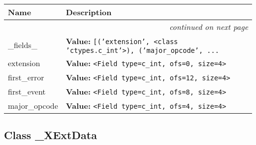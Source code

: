     \vspace{-1cm}
\hspace{\varindent}\begin{longtable}{|p{\varnamewidth}|p{\vardescrwidth}|l}
\cline{1-2}
\cline{1-2} \centering \textbf{Name} & \centering \textbf{Description}& \\
\cline{1-2}
\endhead\cline{1-2}\multicolumn{3}{r}{\small\textit{continued on next page}}\\\endfoot\cline{1-2}
\endlastfoot\raggedright \_\-f\-i\-e\-l\-d\-s\-\_\- & \raggedright \textbf{Value:} 
{\tt \texttt{[}\texttt{(}\texttt{'}\texttt{extension}\texttt{'}\texttt{, }{\textless}class 'ctypes.c\_int'{\textgreater}\texttt{)}\texttt{, }\texttt{(}\texttt{'}\texttt{major\_opcode}\texttt{'}\texttt{, }\texttt{...}}&\\
\cline{1-2}
\raggedright e\-x\-t\-e\-n\-s\-i\-o\-n\- & \raggedright \textbf{Value:} 
{\tt {\textless}Field type=c\_int, ofs=0, size=4{\textgreater}}&\\
\cline{1-2}
\raggedright f\-i\-r\-s\-t\-\_\-e\-r\-r\-o\-r\- & \raggedright \textbf{Value:} 
{\tt {\textless}Field type=c\_int, ofs=12, size=4{\textgreater}}&\\
\cline{1-2}
\raggedright f\-i\-r\-s\-t\-\_\-e\-v\-e\-n\-t\- & \raggedright \textbf{Value:} 
{\tt {\textless}Field type=c\_int, ofs=8, size=4{\textgreater}}&\\
\cline{1-2}
\raggedright m\-a\-j\-o\-r\-\_\-o\-p\-c\-o\-d\-e\- & \raggedright \textbf{Value:} 
{\tt {\textless}Field type=c\_int, ofs=4, size=4{\textgreater}}&\\
\cline{1-2}
\end{longtable}



\subsection{Class \_XExtData}

